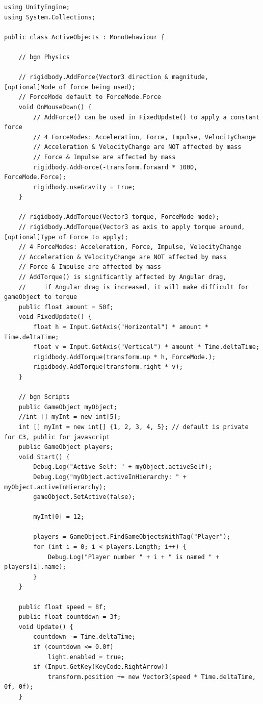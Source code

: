 \documentclass[9pt, b5paper]{article}
\begin{document}
\begin{verbatim}
using UnityEngine;
using System.Collections;

public class ActiveObjects : MonoBehaviour {

    // bgn Physics
    
    // rigidbody.AddForce(Vector3 direction & magnitude, [optional]Mode of force being used); 
    // ForceMode default to ForceMode.Force
    void OnMouseDown() {
        // AddForce() can be used in FixedUpdate() to apply a constant force
        // 4 ForceModes: Acceleration, Force, Impulse, VelocityChange
        // Acceleration & VelocityChange are NOT affected by mass
        // Force & Impulse are affected by mass
        rigidbody.AddForce(-transform.forward * 1000, ForceMode.Force);
        rigidbody.useGravity = true;
    }
    
    // rigidbody.AddTorque(Vector3 torque, ForceMode mode);
    // rigidbody.AddTorque(Vector3 as axis to apply torque around, [optional]Type of Force to apply);
    // 4 ForceModes: Acceleration, Force, Impulse, VelocityChange
    // Acceleration & VelocityChange are NOT affected by mass
    // Force & Impulse are affected by mass
    // AddTorque() is significantly affected by Angular drag, 
    //     if Angular drag is increased, it will make difficult for gameObject to torque
    public float amount = 50f;
    void FixedUpdate() {
        float h = Input.GetAxis("Horizontal") * amount * Time.deltaTime;
        float v = Input.GetAxis("Vertical") * amount * Time.deltaTime;
        rigidbody.AddTorque(transform.up * h, ForceMode.);
        rigidbody.AddTorque(transform.right * v);
    }
    
    // bgn Scripts
    public GameObject myObject;
    //int [] myInt = new int[5];
    int [] myInt = new int[] {1, 2, 3, 4, 5}; // default is private for C3, public for javascript
    public GameObject players;
    void Start() {
        Debug.Log("Active Self: " + myObject.activeSelf);
        Debug.Log("myObject.activeInHierarchy: " + myObject.activeInHierarchy);
        gameObject.SetActive(false);

        myInt[0] = 12;

        players = GameObject.FindGameObjectsWithTag("Player");
        for (int i = 0; i < players.Length; i++) {
            Debug.Log("Player number " + i + " is named " + players[i].name);
        }
    }

    public float speed = 8f;
    public float countdown = 3f;
    void Update() {
        countdown -= Time.deltaTime;
        if (countdown <= 0.0f) 
            light.enabled = true;
        if (Input.GetKey(KeyCode.RightArrow)) 
            transform.position += new Vector3(speed * Time.deltaTime, 0f, 0f);
    }


\end{verbatim}
\end{document}
